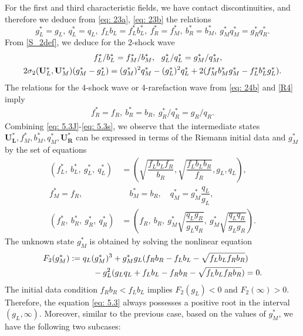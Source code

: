 \documentclass[11pt]{article}
\numberwithin{equation}{section}
\newtheorem{counter example}[theorem]{Counter Example}
\begin{document}
{For the first and third characteristic fields, we have contact discontinuities, and therefore we deduce from \eqref{eq: 23a}, \eqref{eq: 23b} the relations 
\begin{equation}\label{eq: 5.3J}
 g^*_L=g_L,\ q^*_L=q_L,\ f_Lb_L=f^*_Lb^*_L,\
 f^*_R=f_M^*,\ b^*_R=b_M^*,\  g_M^*q_M^*=g^*_Rq^*_R.
\end{equation}
From \eqref{S_2def}, we deduce for the $2$-shock wave 
\begin{align}\label{eq: 5.3S} 
&\hspace{2.9 cm} \ f_L^*/b_L^*=f_M^*/b_M^*,~\ g_L^*/q_L^*=g_M^*/q_M^*, ~\ \\
&2\sigma_2(\mathbf{U}_L^*, \mathbf{U}_M^*)(g_M^*-g_L^*)=(g_M^*)^2 q_M^*-(g_L^*)^2 q_L^*+2(f_M^*b_M^*g_M^*-f_L^*b_L^*g_L^*).
\end{align}
The relations for the 4-shock wave or 4-rarefaction wave from \eqref{eq: 24b} and \eqref{R4} imply
\begin{align}\label{eq: 5.3s}  
f_R^*=f_R,~b_R^*=b_R,~g_R^*/q_R^*=g_R/q_R.
\end{align}
Combining \eqref{eq: 5.3J}-\eqref{eq: 5.3s}, we observe that the intermediate states 
$\mathbf{U_L^*}, f^*_M, b^*_M, q^*_M, \mathbf{U_R^*} $ can be expressed in terms of the Riemann initial data and $g^*_M$ by the set of equations 
\begin{align*}
(f_L^*,~b_L^*,~g_L^*,~q_L^*)&=\left(\sqrt{\dfrac{f_Lb_Lf_R}{b_R}}, \sqrt{\dfrac{f_Lb_Lb_R}{f_R}}, g_L, q_L\right), \\
    f_M^* = f_R, & \quad  b_M^* = b_R, \quad  q_M^*=g_M^* \dfrac{q_L}{g_L},  \\
    (f_R^*,~b_R^*,~g_R^*,~q_R^*)&=\left(f_R,~ b_R, ~g_M^*\sqrt{\dfrac{q_Lg_R}{g_Lq_R}},~g_M^* \sqrt{\dfrac{q_Lq_R}{g_Lg_R}}\right).
\end{align*}
The unknown state $g_M^*$ is obtained by solving the nonlinear equation 
\begin{align}\label{eq: 5.3}
   F_2(g_M^*)&:= q_L(g_M^*)^3+g_M^* g_L(f_Rb_R-f_Lb_L-\sqrt{f_L b_L f_R b_R})\nonumber\\
   &\hspace{1 cm}-g_L^2(g_Lq_L+f_Lb_L-f_Rb_R-\sqrt{f_L b_L f_R b_R})=0.
\end{align}
The initial data condition $f_Rb_R<f_Lb_L$ implies $F_2(g_L)<0$ and $F_2(\infty)>0$. Therefore, the equation \eqref{eq: 5.3} always possesses a positive root in the interval $(g_L, \infty)$. Moreover, similar to the previous case, based on the values of $g_M^*$, we have the following two subcases:
\begin{enumerate}

\end{enumerate}}
\end{document}
